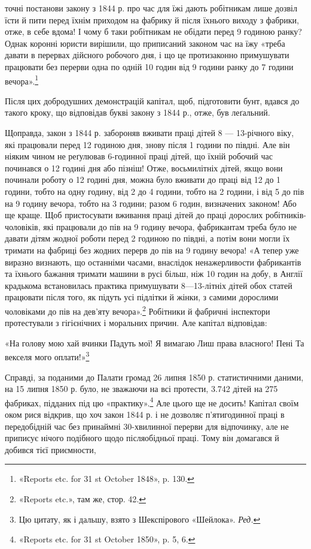 \parcont{}  %
точні постанови закону з 1844 р. про час для їжі дають робітникам
лише дозвіл їсти й пити перед їхнім приходом на фабрику
й після їхнього виходу з фабрики, отже, в себе вдома! І чому б
таки робітникам не обідати перед 9 годиною ранку? Однак коронні
юристи вирішили, що приписаний законом час на їжу «треба
давати в перервах дійсного робочого дня, і що це протизаконно
примушувати працювати без перерви одна по одній 10 годин
від 9 години ранку до 7 години вечора».\footnote{
«Reports etc. for 31 st October 1848», p. 130.
}

Після цих добродушних демонстрацій капітал, щоб, підготовити
бунт, вдався до такого кроку, що відповідав букві закону
з 1844 р., отже, був леґальний.

Щоправда, закон з 1844 р. забороняв вживати праці дітей 8 —
13-річного віку, які працювали перед 12 годиною дня, знову після
1 години по півдні. Але він ніяким чином не реґулював 6-годинної
праці дітей, що їхній робочий час починався о 12 годині
дня або пізніш! Отже, восьмилітніх дітей, якщо вони починали
роботу о 12 годині дня, можна було вживати до праці від 12 до
1 години, тобто на одну годину, від 2 до 4 години, тобто на 2 години,
і від 5 до пів на 9 годину вечора, тобто на 3 години; разом
6 годин, визначених законом! Або ще краще. Щоб пристосувати
вживання праці дітей до праці дорослих робітників-чоловіків, які
працювали до пів на 9 годину вечора, фабрикантам треба було не
давати дітям жодної роботи перед 2 годиною по півдні, а потім вони
могли їх тримати на фабриці без жодних перерв до пів на 9 годину
вечора! «А тепер уже виразно визнають, що останніми часами,
внаслідок ненажерливости фабрикантів та їхнього бажання тримати
машини в русі більш, ніж 10 годин на добу, в Англії крадькома
встановилась практика примушувати 8—13-літніх дітей
обох статей працювати після того, як підуть усі підлітки й жінки,
з самими дорослими чоловіками до пів на дев’яту вечора».\footnote{
«Reports etc.», там же, стор. 42.
}
Робітники й фабричні інспектори протестували з гігієнічних і
моральних причин. Але капітал відповідав:

«На голову мою хай вчинки
Падуть мої! Я вимагаю
Лиш права власного! Пені
Та векселя мого оплати!»\footnote*{
Цю цитату, як і дальшу, взято з Шекспірового «Шейлока». \emph{Ред.}
}

Справді, за поданими до Палати громад 26 липня 1850 р.
статистичними даними, на 15 липня 1850 р. було, не зважаючи
на всі протести, 3.742 дітей на 275 фабриках, підданих під цю
«практику».\footnote{
«Reports etc. for 31 st October 1850», p. 5, 6.
} Але цього ще не досить! Капітал своїм оком
рися відкрив, що хоч закон 1844 р. і не дозволяє п’ятигодинної
праці в передобідній час без принаймні 30-хвилинної перерви
для відпочинку, але не приписує нічого подібного щодо післяобідньої
праці. Тому він домагався й добився тієї приємности,
\parbreak{}  %
